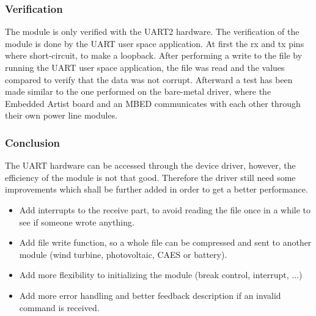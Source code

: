 \subsubsection{Verification}
The module is only verified with the UART2 hardware. The verification of the module is done by the UART user space application. At first the rx and tx pins where short-circuit, to make a loopback. After performing a write to the file by running the UART user space application, the file was read and the values compared to verify that the data was not corrupt. Afterward a test has been made similar to the one performed on the bare-metal driver, where the Embedded Artist board and an MBED communicates with each other through their own power line modules. 
%
\subsubsection{Conclusion}
The UART hardware can be accessed through the device driver, however, the efficiency of the module is not that good. Therefore the driver still need some improvements which shall be further added in order to get a better performance. 
\begin{itemize}
	\item Add interrupts to the receive part, to avoid reading the file once in a while to see if someone wrote anything.
	\item Add file write function, so a whole file can be compressed and sent to another module (wind turbine, photovoltaic, CAES or battery).
	\item Add more flexibility to initializing the module (break control, interrupt, ...) 
	\item Add more error handling and better feedback description if an invalid command is received.
\end{itemize}

